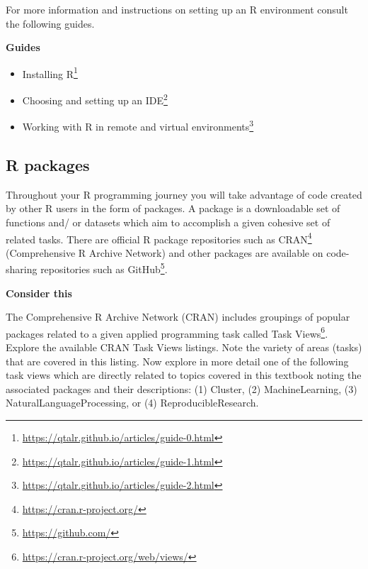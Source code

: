 \documentclass[
  letterpaper,
]{latex/krantz}
\providecommand{\tightlist}{%
  \setlength{\itemsep}{0pt}\setlength{\parskip}{0pt}}\usepackage{longtable,booktabs,array}
\DeclareRobustCommand{\href}[2]{#2\footnote{\url{#1}}}
\begin{document}
For more information and instructions on setting up an R environment
consult the following guides.

\begin{tcolorbox}[enhanced jigsaw, left=2mm, arc=.35mm, colback=white, rightrule=.15mm, toprule=.15mm, breakable, leftrule=.75mm, opacityback=0, bottomrule=.15mm]

\textbf{ Guides}

\begin{itemize}
\tightlist
\item
  \href{https://qtalr.github.io/articles/guide-0.html}{Installing R}
\item
  \href{https://qtalr.github.io/articles/guide-1.html}{Choosing and
  setting up an IDE}
\item
  \href{https://qtalr.github.io/articles/guide-2.html}{Working with R in
  remote and virtual environments}
\end{itemize}

\end{tcolorbox}

\hypertarget{r-packages}{%
\subsection*{R packages}\label{r-packages}}

Throughout your R programming journey you will take advantage of code
created by other R users in the form of packages. A package is a
downloadable set of functions and/ or datasets which aim to accomplish a
given cohesive set of related tasks. There are official R package
repositories such as \href{https://cran.r-project.org/}{CRAN}
(Comprehensive R Archive Network) and other packages are available on
code-sharing repositories such as \href{https://github.com/}{GitHub}.

\begin{tcolorbox}[enhanced jigsaw, left=2mm, arc=.35mm, colback=white, rightrule=.15mm, toprule=.15mm, breakable, leftrule=.75mm, opacityback=0, bottomrule=.15mm]

\textbf{ Consider this}

The Comprehensive R Archive Network (CRAN) includes groupings of popular
packages related to a given applied programming task called
\href{https://cran.r-project.org/web/views/}{Task Views}. Explore the
available CRAN Task Views listings. Note the variety of areas (tasks)
that are covered in this listing. Now explore in more detail one of the
following task views which are directly related to topics covered in
this textbook noting the associated packages and their descriptions: (1)
Cluster, (2) MachineLearning, (3) NaturalLanguageProcessing, or (4)
ReproducibleResearch.

\end{tcolorbox}
\end{document}
